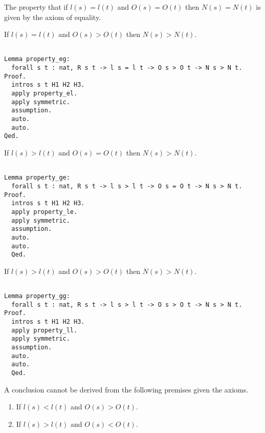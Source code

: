 The property that if $l(s) = l(t)$ and $O(s) = O(t)$ then $N(s) = N(t)$ is given by the axiom of equality.

If $l(s) = l(t)$ and $O(s) > O(t)$ then $N(s) > N(t)$.

\begin{sourcecode}
{\scriptsize \begin{verbatim}

Lemma property_eg:
  forall s t : nat, R s t -> l s = l t -> O s > O t -> N s > N t.
Proof.
  intros s t H1 H2 H3.
  apply property_el.
  apply symmetric.
  assumption.
  auto.
  auto.
Qed.

\end{verbatim}}
\end{sourcecode}

If $l(s) > l(t)$ and $O(s) = O(t)$ then $N(s) > N(t)$.

\begin{sourcecode}
{\scriptsize \begin{verbatim}

Lemma property_ge:
  forall s t : nat, R s t -> l s > l t -> O s = O t -> N s > N t.
Proof.
  intros s t H1 H2 H3.
  apply property_le.
  apply symmetric.
  assumption.
  auto.
  auto.
  Qed.

\end{verbatim}}
\end{sourcecode}

If $l(s) > l(t)$ and $O(s) > O(t)$ then $N(s) > N(t)$.

\begin{sourcecode}
{\scriptsize \begin{verbatim}

Lemma property_gg:
  forall s t : nat, R s t -> l s > l t -> O s > O t -> N s > N t.
Proof.
  intros s t H1 H2 H3.
  apply property_ll.
  apply symmetric.
  assumption.
  auto.
  auto.
  Qed.

\end{verbatim}}
\end{sourcecode}

A conclusion cannot be derived from the following premises given the axioms.

\begin{enumerate}[label=(\roman*)]
\item If $l(s) < l(t)$ and $O(s) > O(t)$.
\item If $l(s) > l(t)$ and $O(s) < O(t)$.
\end{enumerate}




